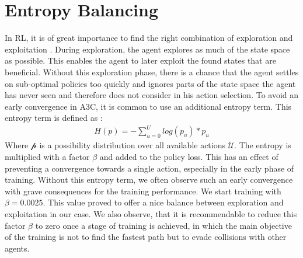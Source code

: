\section{Entropy Balancing}\label{entropy_balancing_hyperparameter}
In RL, it is of great importance to find the right combination of exploration and exploitation \cite{explorationexploitation}. During exploration, the agent explores as much of the state space as possible. This enables the agent to later exploit the found states that are beneficial. Without this exploration phase, there is a chance that the agent settles on sub-optimal policies too quickly and ignores parts of the state space the agent has never seen and therefore does not consider in his action selection. To avoid an early convergence in A3C, it is common to use an additional entropy term. This entropy term is defined as \cite{a3c}:
\begin{gather*}
H(p) = -\sum_{u=0}^{U}log(p_{u})*p_{u}
\end{gather*}
Where $\mathcal{p}$ is a possibility distribution over all available actions $\mathcal{U}$. The entropy is multiplied with a factor $\beta$ and added to the policy loss. This has an effect of preventing a convergence towards a single action, especially in the early phase of training. Without this entropy term, we often observe such an early convergence with grave consequences for the training performance. We start training with $\beta=0.0025$. This value proved to offer a nice balance between exploration and exploitation in our case. We also observe, that it is recommendable to reduce this factor $\beta$ to zero once a stage of training is achieved, in which the main objective of the training is not to find the fastest path but to evade collisions with other agents.
